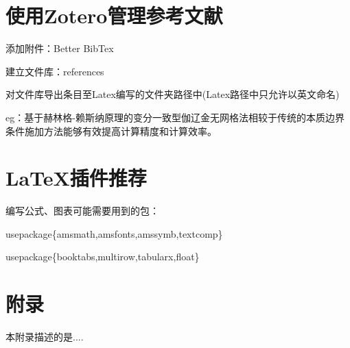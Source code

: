 \documentclass[engineeringmaster]{hquThesis}
\begin{document}
\chapter{使用Zotero管理参考文献}
添加附件：Better BibTex

建立文件库：references

对文件库导出条目至Latex编写的文件夹路径中(Latex路径中只允许以英文命名)

eg：基于赫林格-赖斯纳原理的变分一致型伽辽金无网格法\cite{Wu2022,wu2023}相较于传统的本质边界条件施加方法能够有效提高计算精度和计算效率。




\chapter{\LaTeX 插件推荐}
编写公式、图表可能需要用到的包：

usepackage\{amsmath,amsfonts,amssymb,textcomp\}

usepackage\{booktabs,multirow,tabularx,float\}



\appendix

\chapter{附录}
本附录描述的是....


\backmatter


\end{document}
